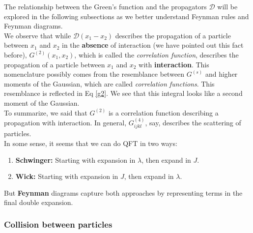 \documentclass{book}
\theoremstyle{definition}
\newcommand{\D}{\mathcal{D}}
\begin{document}
The relationship between the Green's function and the propagators $\D$ will be explored in the following subsections as we better understand Feynman rules and Feynman diagrams.\\

We observe that while $\D(x_1 - x_2)$ describes the propagation of a particle between $x_1$ and $x_2$ in the \textbf{absence} of interaction (we have pointed out this fact before), $G^{(2)}(x_1,x_2)$, which is called the \textit{correlation function}, describes the propagation of a particle between $x_1$ and $x_2$ with \textbf{interaction}. This nomenclature possibly comes from the resemblance between $G^{(s)}$ and higher moments of the Gaussian, which are called \textit{correlation functions}. This resemblance is reflected in Eq \eqref{g2}. We see that this integral looks like a second moment of the Gaussian.\\

To summarize, we said that $G^{(2)}$ is a correlation function describing a propagation with interaction. In general, $G^{(4)}_{ijkl}$, say, describes the scattering of particles. \\


In some sense, it seems that we can do QFT in two ways:
\begin{enumerate}
	\item \textbf{Schwinger:} Starting with expansion in $\lambda$, then expand in $J$.
	\item \textbf{Wick:} Starting with expansion in $J$, then expand in $\lambda$.
\end{enumerate}

But \textbf{Feynman} diagrams capture both approaches by representing terms in the final double expansion. 

















\subsubsection{Collision between particles}
\end{document}
